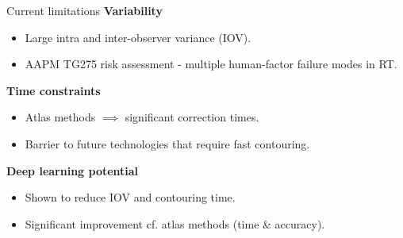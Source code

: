 \documentclass[9pt]{beamer}
\begin{document}
\begin{frame}{Current limitations}
\textbf{Variability}
\begin{itemize}
\item Large intra and inter-observer variance (IOV).\footnotemark[1]
\item  AAPM TG275 risk assessment - multiple human-factor failure modes in RT.\footnotemark[2]
\end{itemize}
\vspace{4mm}

\textbf{Time constraints}
\begin{itemize}
	\item Atlas methods $\implies$ significant correction times.\footnotemark[3]
	\item Barrier to future technologies that require fast contouring.\footnotemark[3]
\end{itemize}
\vspace{4mm}

\textbf{Deep learning potential}
\begin{itemize}
	\item Shown to reduce IOV and contouring time.\footnotemark[3]
	\item Significant improvement cf. atlas methods (time \& accuracy).\footnotemark[4]
\end{itemize}
\end{frame}
%
\end{document}
